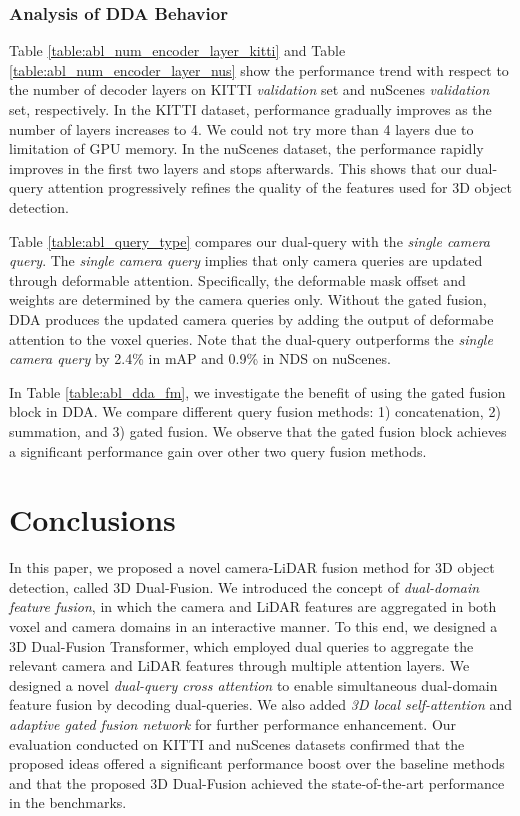 \documentclass[lettersize,journal]{IEEEtran}
\begin{document}
 \subsubsection{Analysis of DDA Behavior}
Table \ref{table:abl_num_encoder_layer_kitti} and Table \ref{table:abl_num_encoder_layer_nus} show the performance trend with respect to the number of decoder layers on KITTI {\it validation} set and nuScenes {\it validation} set, respectively. In the KITTI dataset, performance gradually improves as the number of layers increases to 4. We could not try more than 4 layers due to limitation of GPU memory. In the nuScenes dataset, the performance rapidly improves in the first two layers and stops afterwards. This shows that our dual-query attention progressively refines the quality of the features used for 3D object detection.  

Table \ref{table:abl_query_type} compares our dual-query with the {\it single camera query}. The {\it single camera query} implies that only camera queries are updated through deformable attention. Specifically, the deformable mask offset and weights are determined by the camera queries only. Without the gated fusion, DDA produces the updated camera queries by adding the output of deformabe attention to the voxel queries. Note that the dual-query outperforms the {\it single camera query} by 2.4\% in mAP and 0.9\% in NDS on nuScenes.

In Table \ref{table:abl_dda_fm}, we investigate the benefit of using the gated fusion block in DDA. We compare different query fusion methods: 1) concatenation, 2) summation, and 3) gated fusion. We observe that the gated fusion block achieves a significant performance gain over other two query fusion methods.



 

\section{Conclusions}
In this paper, we proposed a novel camera-LiDAR fusion method for 3D object detection, called 3D Dual-Fusion. We introduced the concept of {\it dual-domain feature fusion}, in which the camera and LiDAR features  are aggregated in both voxel and camera domains in an interactive manner. To this end, we designed a 3D Dual-Fusion Transformer, which employed dual queries to aggregate the relevant  camera and LiDAR features through multiple attention layers. We designed a novel {\it dual-query cross attention} to enable simultaneous dual-domain feature fusion by decoding dual-queries. We also added {\it 3D local self-attention} and {\it adaptive gated fusion network} for further performance enhancement. Our evaluation conducted on KITTI and nuScenes datasets confirmed that the proposed ideas offered a significant performance boost over the baseline methods and that the proposed 3D Dual-Fusion achieved the state-of-the-art performance in the benchmarks.


{


}













\vfill
\end{document}
